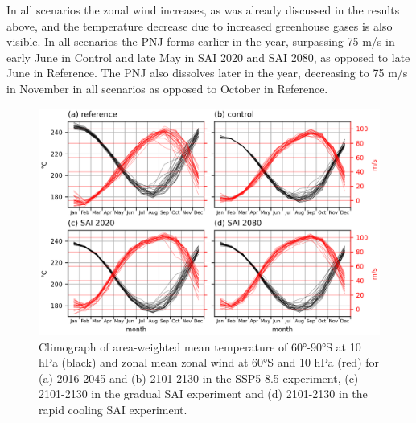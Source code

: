 In all scenarios the zonal wind increases, as was already discussed in the results above, and the temperature decrease due to increased greenhouse gases is also visible. In all scenarios the PNJ forms earlier in the year, surpassing 75 m/s in early June in Control and late May in SAI 2020 and SAI 2080, as opposed to late June in Reference. The PNJ also dissolves later in the year, decreasing to 75 m/s in November in all scenarios as opposed to October in Reference.

\begin{figure}[H]
	\centering
	\includegraphics[width=0.95\linewidth]{images/PNJ_climographTU.png}
	\caption{Climograph of area-weighted mean temperature of 60°-90°S at 10 hPa (black) and zonal mean zonal wind at 60°S and 10 hPa (red) for (a) 2016-2045 and (b) 2101-2130 in the SSP5-8.5 experiment, (c) 2101-2130 in the gradual SAI experiment and (d) 2101-2130 in the rapid cooling SAI experiment.}
	\label{fig:PNJ_climographTU}
\end{figure}